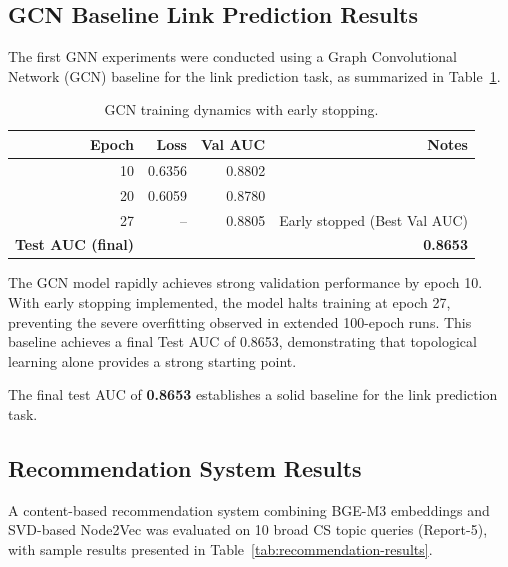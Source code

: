 \subsection{GCN Baseline Link Prediction Results}

The first GNN experiments were conducted using a Graph Convolutional Network (GCN) baseline for the link prediction task, as summarized in Table~\ref{tab:gcn-results}.

\begin{table}[htbp]
\centering
\caption{GCN training dynamics with early stopping.}
\label{tab:gcn-results}
\begin{tabular}{rrrr}
\toprule
\textbf{Epoch} & \textbf{Loss} & \textbf{Val AUC} & \textbf{Notes} \\
\midrule
10 & 0.6356 & 0.8802 & \\
20 & 0.6059 & 0.8780 & \\
27 & --     & 0.8805 & Early stopped (Best Val AUC) \\
\midrule
\textbf{Test AUC (final)} & \multicolumn{3}{r}{\textbf{0.8653}} \\
\bottomrule
\end{tabular}
\end{table}

The GCN model rapidly achieves strong validation performance by epoch 10. With early stopping implemented, the model halts training at epoch 27, preventing the severe overfitting observed in extended 100-epoch runs. This baseline achieves a final Test AUC of 0.8653, demonstrating that topological learning alone provides a strong starting point.

The final test AUC of \textbf{0.8653} establishes a solid baseline for the link prediction task.

\subsection{Recommendation System Results}

A content-based recommendation system combining BGE-M3 embeddings and SVD-based Node2Vec was evaluated on 10 broad CS topic queries (Report-5), with sample results presented in Table~\ref{tab:recommendation-results}.

